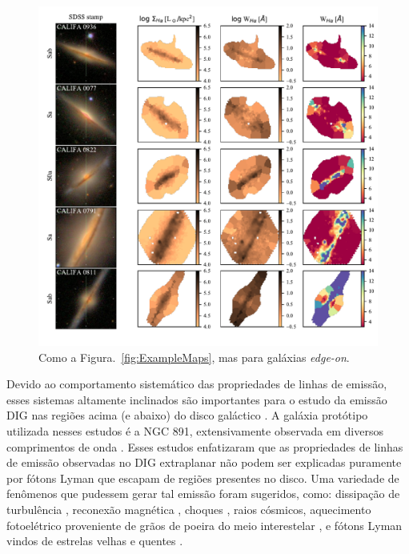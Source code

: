 \begin{figure}
 \includegraphics{figuras/fig_maps_class_edgeon_paper.pdf}
 \caption[Imagem \SDSS e mapas de $\Sigma_{{\rm H}\alpha}$ e $W_{{\rm H}\alpha}$: sistemas {\em edge-on}]
 {Como a Figura.\ \ref{fig:ExampleMaps}, mas para galáxias {\em edge-on}.}
 \label{fig:ExampleMapsEdgeOn}
\end{figure}

Devido ao comportamento sistemático das propriedades de linhas de emissão, esses sistemas altamente inclinados são importantes para o estudo da emissão DIG nas regiões acima (e abaixo) do disco galáctico \citep{Tullmann.and.Dettmar.2000, Otte.etal.2002, Jones.etal.2017}. A galáxia protótipo utilizada nesses estudos é a NGC 891, extensivamente observada em diversos comprimentos de onda \citep{Rand.1998, Hodges.and.Bregman.2013, Seon.etal.2014, Hughes.etal.2015}. Esses estudos enfatizaram que as propriedades de linhas de emissão observadas no DIG extraplanar não podem ser explicadas puramente por fótons Lyman que escapam de regiões \hii presentes no disco. Uma variedade de fenômenos que pudessem gerar tal emissão foram sugeridos, como: dissipação de turbulência \citep{Minter.and.Spangler.1997}, reconexão magnética \citep{Raymond.1992}, choques \citep{CollinsRand.2001}, raios cósmicos, aquecimento fotoelétrico proveniente de grãos de poeira do meio interestelar  \citep{Weingartner.and.Draine.2001}, e fótons Lyman vindos de estrelas velhas e quentes \citep{FloresFajardo.etal.2011a}.

